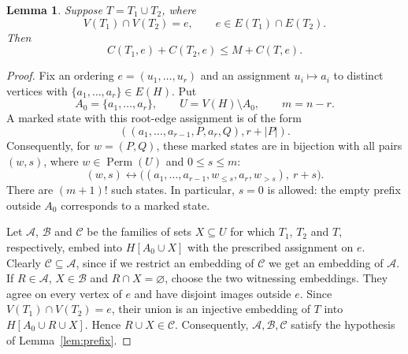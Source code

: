 \documentclass[11pt]{article}
\newtheorem{lemma}[theorem]{Lemma}
\theoremstyle{remark}
\numberwithin{equation}{section}
\DeclareMathOperator{\Perm}{Perm}
\begin{document}
	
	
	
	
	\begin{lemma}\label{lem:root-gluing}
		Suppose $T=T_1\cup T_2$, where
		\[
		V(T_1)\cap V(T_2)=e,\qquad e\in E(T_1)\cap E(T_2).
		\]
		Then
		\begin{equation}\label{eq:root-gluing}
			C(T_1,e)+C(T_2,e)\le M+C(T,e).
		\end{equation}
	\end{lemma}
	
	\begin{proof}
		Fix an ordering $e=(u_1,\ldots,u_r)$ and an assignment
		$u_i\mapsto a_i$ to distinct vertices with
		$\{a_1,\ldots,a_r\}\in E(H)$. Put
		\[
		A_0=\{a_1,\ldots,a_r\},\qquad U=V(H)\setminus A_0,
		\qquad m=n-r.
		\]
		A marked state with this root-edge assignment is of the form 
		$$((a_1, \ldots, a_{r-1}, P, a_r, Q), r+|P|).$$
		Consequently, for $w=(P, Q)$, these marked states are in bijection
		with all pairs $(w,s)$, where $w\in\Perm(U)$ and $0\le s\le m$:
		\begin{equation}\label{eq:fiber}
			(w,s)\longleftrightarrow
			\bigl((a_1,\ldots,a_{r-1},w_{\le s},a_r,w_{>s}),\ r+s\bigr).
		\end{equation}
		There are $(m+1)!$ such states. In particular, $s=0$ is allowed:
		the empty prefix outside $A_0$ corresponds to a marked state.
		
		
		Let $\mathcal A$, $\mathcal B$ and $\mathcal C$ be the families of
		sets $X\subseteq U$ for which $T_1$, $T_2$ and $T$, respectively,
		embed into $H[A_0\cup X]$ with the prescribed assignment on $e$.
		Clearly $\mathcal C\subseteq\mathcal A$, since if we restrict an embedding of $\mathcal C$ we get an embedding of $\mathcal A$.
		If $R\in\mathcal A$, $X\in\mathcal B$ and $R\cap X=\varnothing$,
		choose the two witnessing embeddings. They agree on every vertex
		of $e$ and have disjoint images outside $e$. Since
		$V(T_1)\cap V(T_2)=e$, their union is an injective embedding of
		$T$ into $H[A_0\cup R\cup X]$. Hence $R\cup X\in\mathcal C$.
		Consequently, $\mathcal A, \mathcal B, \mathcal C$ satisfy the hypothesis of Lemma~\ref{lem:prefix}.
		

\end{proof}
\end{document}
